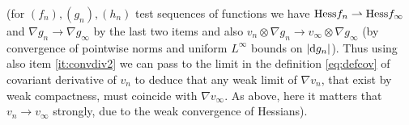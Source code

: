 \documentclass[11pt]{article}
\numberwithin{equation}{section}
\newcommand{\R}{\mathbb{R}}
\newcommand{\X}{{\rm X}}
\newcommand{\mm}{{\mathfrak m}}
\renewcommand{\d}{{\rm d}}
\newcommand{\Hess}{{\rm Hess}}
\newcommand{\limi}{\varliminf}
\newcommand{\weakto}{\rightharpoonup}
\newcommand\la{\langle}
\newcommand\ra{\rangle}
\begin{document}
\begin{enumerate}[label=(\roman*)]
{\footnotesize {\vspace{-5pt}}(for $(f_n),(g_n),(h_n)$ test sequences of functions we have $\Hess f_n\weakto \Hess f_\infty$ and $\nabla g_n\to \nabla g_\infty$ by the last two items and also $v_n\otimes \nabla g_n\to v_\infty\otimes \nabla g_\infty$  (by convergence of pointwise norms and uniform $L^\infty$ bounds on $|\d g_n|$). Thus using also item \ref{it:convdiv2} we can pass to the limit in the definition \eqref{eq:defcov} of covariant derivative of $v_n$ to deduce that any weak limit of $\nabla v_n$, that exist by weak compactness, must coincide with $\nabla v_\infty$. As above, here it matters that $v_n\to v_\infty$ strongly, due to the weak convergence of Hessians).}


%
%
%
%
%
%
%
%
%

\end{enumerate}
\end{document}

